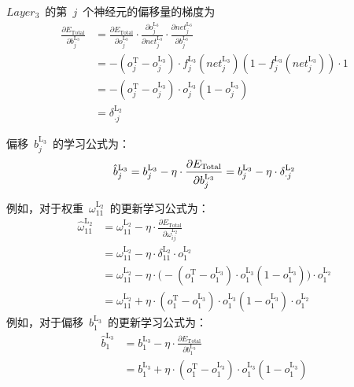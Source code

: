 \documentclass[a4paper, UTF8, heading = true, scheme = chinese, linespread = 1.66, titlepage]{ctexart}
\begin{document}
$Layer_3$~的第~$j$~个神经元的偏移量的梯度为
\begin{align}
\frac{\partial E_{\text{Total}}}{\partial b^{\text{L}_3}_{j}}
&= \frac{\partial E_{\text{Total}}}{\partial o^{\text{L}_3}_{j}} \cdot \frac{\partial o^{\text{L}_3}_{j}}{\partial net^{\text{L}_3}_{j}} \cdot \frac{\partial net^{\text{L}_3}_{j}}{\partial b^{\text{L}_3}_{j}} \\
&= -(o^{\text{T}}_{j} - o^{\text{L}_3}_{j}) \cdot f^{\text{L}_3}_{j}{(net^{\text{L}_3}_j)}(1 - f^{\text{L}_3}_{j}{(net^{\text{L}_3}_j)}) \cdot 1 \\
&= -(o^{\text{T}}_{j} - o^{\text{L}_3}_{j}) \cdot o^{\text{L}_3}_{j}(1 - o^{\text{L}_3}_{j}) \\
&= \delta^{\text{L}_2}_{\cdot j}
\end{align}

偏移~$b^{\text{L}_3}_{j}$~的学习公式为：
\begin{equation}
\hat{b}^{\text{L}_3}_{j} = b^{\text{L}_3}_{j} - \eta \cdot \frac{\partial E_{\text{Total}}}{\partial b^{\text{L}_3}_{j}} \\
= b^{\text{L}_3}_{j} - \eta \cdot \delta^{\text{L}_2}_{\cdot j}
\end{equation}

例如，对于权重~$\omega^{\text{L}_2}_{11}$~的更新学习公式为：
\begin{align}
\widehat{\omega}^{\text{L}_2}_{11} &= \omega^{\text{L}_2}_{11} - \eta \cdot \frac{\partial E_{\text{Total}}}{\partial \omega^{\text{L}_2}_{ij}} \\
&= \omega^{\text{L}_2}_{11} - \eta \cdot \delta^{\text{L}_2}_{11} \cdot o^{\text{L}_2}_{1} \\
&= \omega^{\text{L}_2}_{11} - \eta \cdot \big(-(o^{\text{T}}_{1} - o^{\text{L}_3}_{1}) \cdot o^{\text{L}_3}_{1}(1 - o^{\text{L}_3}_{1})\big) \cdot o^{\text{L}_2}_{1} \\
&= \omega^{\text{L}_2}_{11} + \eta \cdot (o^{\text{T}}_{1} - o^{\text{L}_3}_{1}) \cdot o^{\text{L}_3}_{1}(1 - o^{\text{L}_3}_{1}) \cdot o^{\text{L}_2}_{1} 
\end{align}
例如，对于偏移~$b^{\text{L}_3}_{1}$~的更新学习公式为：
\begin{align}
\hat{b}^{\text{L}_3}_{1} &= b^{\text{L}_3}_{1} - \eta \cdot \frac{\partial E_{\text{Total}}}{\partial b^{\text{L}_3}_{1}} \\
&= b^{\text{L}_3}_{1} + \eta \cdot (o^{\text{T}}_{1} - o^{\text{L}_3}_{1}) \cdot o^{\text{L}_3}_{1}(1 - o^{\text{L}_3}_{1})
\end{align}
\end{document}
